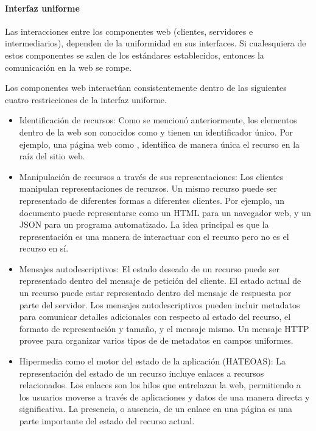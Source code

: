 \paragraph{Interfaz uniforme}
\label{\detokenize{chapter_one/rest:interfaz-uniforme}}
Las interacciones entre los componentes web (clientes, servidores e intermediarios),
dependen de la uniformidad en sus interfaces. Si cualesquiera de estos componentes se
salen de los estándares establecidos, entonces la comunicación en la web
se rompe.

Los componentes web interactúan consistentemente dentro de las siguientes
cuatro restricciones de la interfaz uniforme.

\begin{itemize}
    \item 
    Identificación de recursos:
Como se mencionó anteriormente, los elementos dentro de la web son
conocidos como  y tienen un identificador único. Por ejemplo, una
página web como , identifica de manera única el
recurso en la raíz del sitio web.


\item Manipulación de recursos a través de sus representaciones:
Los clientes manipulan representaciones de recursos. Un mismo
recurso puede ser representado de diferentes formas a diferentes
clientes. Por ejemplo, un documento puede representarse como un HTML
para un navegador web, y un JSON para un programa automatizado. La idea
principal es que la representación es una manera de interactuar con el recurso
pero no es el recurso en sí.


\item Mensajes autodescriptivos:
El estado deseado de un recurso puede ser representado dentro del mensaje
de petición del cliente. El estado actual de un recurso puede estar representado
dentro del mensaje de respuesta por parte del servidor.
Los mensajes autodescriptivos pueden incluir metadatos para comunicar
detalles adicionales con respecto al estado del recurso, el formato
de representación y tamaño, y el mensaje mismo.
Un mensaje HTTP provee  para organizar varios tipos de
de metadatos en campos uniformes.


\item Hipermedia como el motor del estado de la aplicación (HATEOAS):
La representación del estado de un recurso incluye enlaces a recursos
relacionados. Los enlaces son los hilos que entrelazan la web, permitiendo
a los usuarios moverse a través de aplicaciones y datos de una manera directa
y significativa. La presencia, o ausencia, de un enlace en una página es una
parte importante del estado del recurso actual.


\end{itemize}

